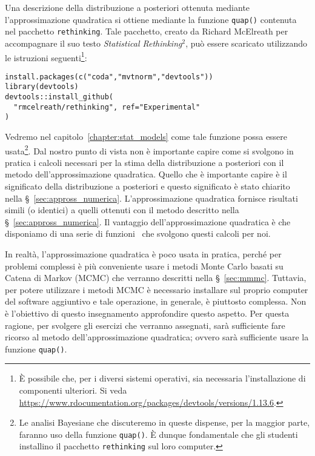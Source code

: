 Una descrizione della distribuzione a posteriori ottenuta mediante l'approssimazione quadratica si ottiene mediante la funzione \texttt{quap()} contenuta nel pacchetto \texttt{rethinking}.
Tale pacchetto, creato da Richard McElreath per accompagnare il suo testo \emph{Statistical Rethinking}$^2$, può essere scaricato utilizzando le istruzioni seguenti\footnote{
È possibile che, per i diversi sistemi operativi, sia necessaria l'installazione di componenti ulteriori. Si veda \url{https://www.rdocumentation.org/packages/devtools/versions/1.13.6}.
}:
\begin{lstlisting}
install.packages(c("coda","mvtnorm","devtools"))
library(devtools)
devtools::install_github(
  "rmcelreath/rethinking", ref="Experimental"
)
\end{lstlisting}
Vedremo nel capitolo~\ref{chapter:stat_models} come tale funzione possa essere usata\footnote{
Le analisi Bayesiane che discuteremo in queste dispense, per la maggior parte, faranno uso della funzione \texttt{quap()}.
È dunque fondamentale che gli studenti installino il pacchetto \texttt{rethinking} sul loro computer.
}.
Dal nostro punto di vista non è importante capire come si svolgono in pratica i calcoli necessari per la stima della distribuzione a posteriori con il metodo dell'approssimazione quadratica.
Quello che è importante capire è il significato della distribuzione a posteriori e questo significato è stato chiarito nella \S~\ref{sec:appross_numerica}.
L'approssimazione quadratica fornisce risultati simili (o identici) a quelli ottenuti con il metodo descritto nella \S~\ref{sec:appross_numerica}.
Il vantaggio dell'approssimazione quadratica è che disponiamo di una serie di funzioni \R\, che svolgono questi calcoli per noi.

In realtà, l'approssimazione quadratica è poco usata in pratica, perché per problemi complessi è più conveniente usare i metodi Monte Carlo basati su Catena di Markov (MCMC) che verranno descritti nella \S~\ref{sec:mmmc}.
Tuttavia, per potere utilizzare i metodi MCMC è necessario installare sul proprio computer del software aggiuntivo e tale operazione, in generale, è piuttosto complessa. 
Non è l'obiettivo di questo insegnamento approfondire questo aspetto. 
Per questa ragione, per svolgere gli esercizi che verranno assegnati, sarà sufficiente fare ricorso al metodo dell'approssimazione quadratica; ovvero sarà sufficiente usare la funzione \texttt{quap()}.


